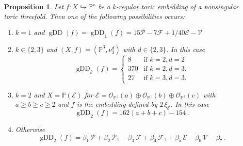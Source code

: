 \documentclass[11pt,reqno]{amsart}
\numberwithin{equation}{section}
\theoremstyle{plain}
\numberwithin{theorem}{section}
\newtheorem{proposition}[theorem]{Proposition}
\theoremstyle{definition}
\renewcommand{\P}{\mathbb{P}}
\newcommand{\VV}{\mathcal{V}}
\newcommand{\EE}{\mathcal{E}}
\newcommand{\FF}{\mathcal{F}}
\newcommand{\OO}{\mathcal{O}}
\newcommand{\PP}{\mathcal{P}}
\newcommand{\gDD}{\operatorname{gDD}}
\begin{document}
\begin{proposition}\label{corol: gEDD 2-regular toric threefold}
Let $f\colon X\hookrightarrow\P^n$ be a $k$-regular toric embedding of a nonsingular toric threefold. Then one of the following possibilities occurs:
\begin{enumerate}
\item $k=1$ and $\gDD(f)=\gDD_1(f) = 15\PP-7\FF+1/40\EE-\VV$
\item $k\in\{2,3\}$ and $(X,f)=(\P^3,\nu_3^d)$ with $d\in\{2,3\}$. In this case
\begin{equation}
    \gDD_k(f) =
    \begin{cases}
    8 & \text{if $k=2,d=2$}\\
    370 & \text{if $k=2,d=3$.}\\
    27 & \text{if $k=3,d=3$.}
    \end{cases}
\end{equation}

\item $k=2$ and $X=\P(\EE)$ for $\EE=\OO_{\P^1}(a)\oplus\OO_{\P^1}(b)\oplus\OO_{\P^1}(c)$ with $a\ge b\ge c\ge 2$ and $f$ is the embedding defined by $2\,\xi_\EE$. In this case
\begin{equation}\label{eq: gEDD 2-regular toric threefold case 2}
    \gDD_2(f)=162(a+b+c)-154\,.    
\end{equation}

\item Otherwise
\begin{equation}\label{eq: gEDD 2-regular toric threefold case 3}
\gDD_2(f) = \beta_1\,\PP+\beta_2\,\PP_1-\beta_3\,\FF+\beta_4\,\FF_1+\beta_5\,\EE-\beta_6\,\VV-\beta_7\,.
\end{equation}
\end{enumerate}
\end{proposition}
\end{document}
